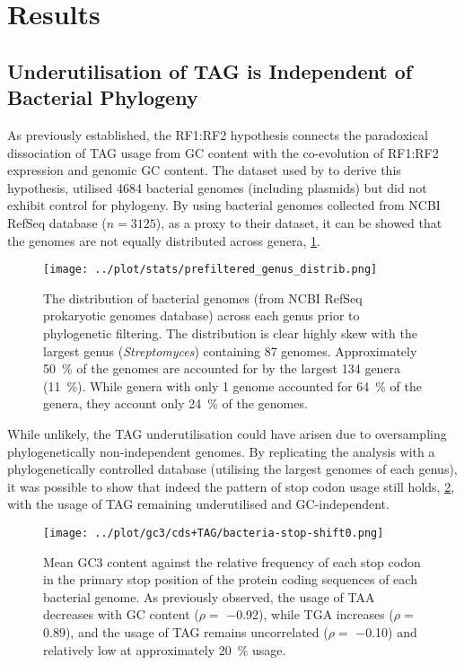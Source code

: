 \documentclass[../main.tex]{subfile}
\begin{document}
 \section{Results}
    \subsection{Underutilisation of TAG is Independent of Bacterial Phylogeny}
        As previously established, the RF1:RF2 hypothesis connects the paradoxical dissociation of TAG usage from GC content with the co-evolution of RF1:RF2 expression and genomic GC content.
        The dataset used by \textcite{Korkmaz2014} to derive this hypothesis, utilised \num{4684} bacterial genomes (including plasmids) but did not exhibit control for phylogeny. By using bacterial genomes collected from NCBI RefSeq database ($n = 3125$), as a proxy to their dataset, it can be showed that the genomes are not equally distributed across genera, \cref{fig:results/dataset/pre}.

        \begin{figure}[H]
            \centering
            \texttt{[image: ../plot/stats/prefiltered\_genus\_distrib.png]}
            \caption{%
                The distribution of bacterial genomes (from NCBI RefSeq prokaryotic genomes database) across each genus prior to phylogenetic filtering.
                The distribution is clear highly skew with the largest genus (\textit{Streptomyces}) containing 87 genomes.
                Approximately \SI{50}{\percent} of the genomes are accounted for by the largest \num{134} genera (\SI{11}{\percent}). While genera with only 1 genome accounted for \SI{64}{\percent} of the genera, they account only \SI{24}{\percent} of the genomes.
            }
            \label{fig:results/dataset/pre}
        \end{figure}

        While unlikely, the TAG underutilisation could have arisen due to oversampling phylogenetically non-independent genomes. By replicating the analysis with a phylogenetically controlled database (utilising the largest genomes of each genus), it was possible to show that indeed the pattern of stop codon usage still holds, \cref{fig:results/bacteria/protein}, with the usage of TAG remaining underutilised and GC-independent.

        \begin{figure}[H]
            \centering
            \texttt{[image: ../plot/gc3/cds+TAG/bacteria-stop-shift0.png]}
            \caption{%
                Mean GC3 content against the relative frequency of each stop codon in the primary stop position of the protein coding sequences of each bacterial genome. As previously observed, the usage of TAA decreases with GC content ($\rho =$ \num{-0.92}), while TGA increases ($\rho =$ \num{0.89}), and the usage of TAG remains uncorrelated ($\rho =$ \num{-0.10}) and relatively low at approximately \SI{20}{\percent} usage.
            }
            \label{fig:results/bacteria/protein}
        \end{figure}
\end{document}
